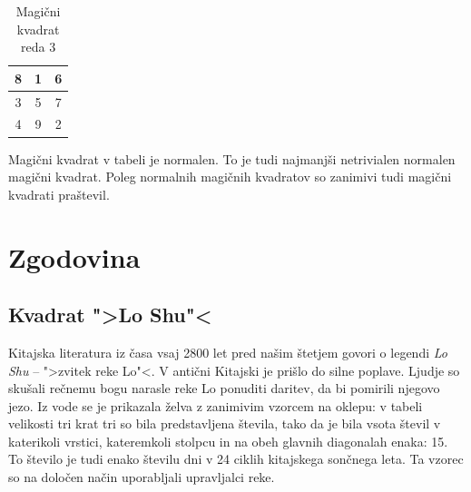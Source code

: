 \documentclass[a4paper,12pt]{article}
\newcommand{\pojem}[1]{\emph{\color{purple}#1}}
\theoremstyle{plain}
\theoremstyle{definition}
\theoremstyle{proof}
\begin{document}

\begin{table}[htp]
   \caption{Magični kvadrat reda 3}
   \centering
   \large
   
\begin{tabular}{|c|c|c|}

\hline
 8 & 1 & 6 \\\hline
 3 & 5 & 7 \\\hline
 4 & 9 & 2 \\\hline
\end{tabular}
\label{table:mag3}
\end{table}


Magični kvadrat v tabeli \cite{ref} je normalen.
To je tudi najmanjši netrivialen normalen magični kvadrat.
Poleg normalnih magičnih kvadratov so zanimivi tudi magični kvadrati praštevil.


\section{Zgodovina}

\subsection{Kvadrat ">Lo Shu"<}

Kitajska literatura iz časa vsaj 2800 let pred našim štetjem govori o legendi
\pojem{Lo Shu} -- ">zvitek reke Lo"<. V antični Kitajski je prišlo do
silne poplave. Ljudje so skušali rečnemu bogu narasle reke Lo ponuditi daritev,
da bi pomirili njegovo jezo. Iz vode se je prikazala želva z zanimivim vzorcem
na oklepu: v tabeli velikosti tri krat tri so bila predstavljena števila, tako
da je bila vsota števil v katerikoli vrstici, kateremkoli stolpcu in na obeh
glavnih diagonalah enaka: 15. To število je tudi enako številu dni v 24 ciklih
kitajskega sončnega leta. Ta vzorec so na določen način uporabljali upravljalci
reke.

\end{document}

